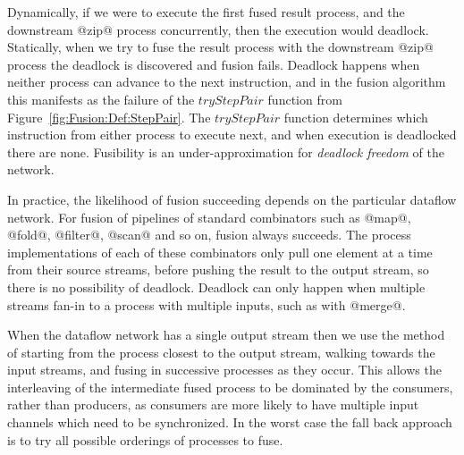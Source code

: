 Dynamically, if we were to execute the first fused result process, and the downstream @zip@ process concurrently, then the execution would deadlock. Statically, when we try to fuse the result process with the downstream @zip@ process the deadlock is discovered and fusion fails. Deadlock happens when neither process can advance to the next instruction, and in the fusion algorithm this manifests as the failure of the $tryStepPair$ function from Figure~\ref{fig:Fusion:Def:StepPair}. The $tryStepPair$ function determines which instruction from either process to execute next, and when execution is deadlocked there are none. Fusibility is an under-approximation for \emph{deadlock freedom} of the network.




In practice, the likelihood of fusion succeeding depends on the particular dataflow network. For fusion of pipelines of standard combinators such as @map@, @fold@, @filter@, @scan@ and so on, fusion always succeeds. The process implementations of each of these combinators only pull one element at a time from their source streams, before pushing the result to the output stream, so there is no possibility of deadlock. Deadlock can only happen when multiple streams fan-in to a process with multiple inputs, such as with @merge@. 

When the dataflow network has a single output stream then we use the method of starting from the process closest to the output stream, walking towards the input streams, and fusing in successive processes as they occur. This allows the interleaving of the intermediate fused process to be dominated by the consumers, rather than producers, as consumers are more likely to have multiple input channels which need to be synchronized. In the worst case the fall back approach is to try all possible orderings of processes to fuse.

